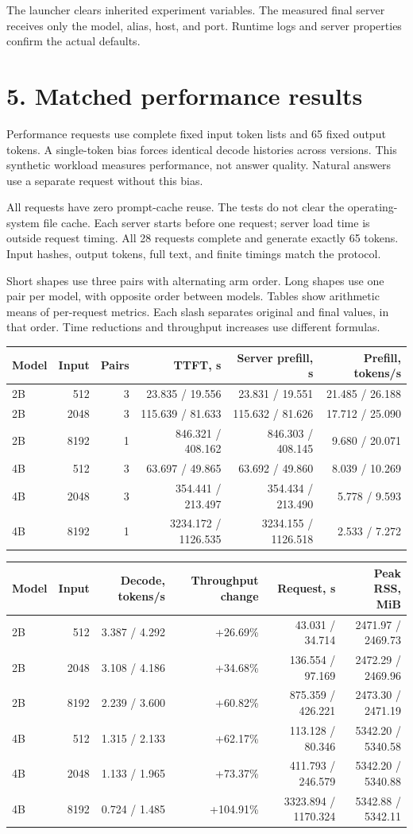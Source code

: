 \documentclass[10pt,a4paper]{article}
\begin{document}
The launcher clears inherited experiment variables. The measured final
server receives only the model, alias, host, and port. Runtime logs and
server properties confirm the actual defaults.

\hypertarget{matched-performance-results}{%
\section{5. Matched performance
results}\label{matched-performance-results}}

Performance requests use complete fixed input token lists and 65 fixed
output tokens. A single-token bias forces identical decode histories
across versions. This synthetic workload measures performance, not
answer quality. Natural answers use a separate request without this
bias.

All requests have zero prompt-cache reuse. The tests do not clear the
operating-system file cache. Each server starts before one request;
server load time is outside request timing. All 28 requests complete and
generate exactly 65 tokens. Input hashes, output tokens, full text, and
finite timings match the protocol.

Short shapes use three pairs with alternating arm order. Long shapes use
one pair per model, with opposite order between models. Tables show
arithmetic means of per-request metrics. Each slash separates original
and final values, in that order. Time reductions and throughput
increases use different formulas.

\begin{longtable}[]{@{}lrrrrr@{}}
\toprule
Model & Input & Pairs & TTFT, s & Server prefill, s & Prefill,
tokens/s\tabularnewline
\midrule
\endhead
2B & 512 & 3 & 23.835 / 19.556 & 23.831 / 19.551 & 21.485 /
26.188\tabularnewline
2B & 2048 & 3 & 115.639 / 81.633 & 115.632 / 81.626 & 17.712 /
25.090\tabularnewline
2B & 8192 & 1 & 846.321 / 408.162 & 846.303 / 408.145 & 9.680 /
20.071\tabularnewline
4B & 512 & 3 & 63.697 / 49.865 & 63.692 / 49.860 & 8.039 /
10.269\tabularnewline
4B & 2048 & 3 & 354.441 / 213.497 & 354.434 / 213.490 & 5.778 /
9.593\tabularnewline
4B & 8192 & 1 & 3234.172 / 1126.535 & 3234.155 / 1126.518 & 2.533 /
7.272\tabularnewline
\bottomrule
\end{longtable}

\begin{longtable}[]{@{}lrrrrr@{}}
\toprule
Model & Input & Decode, tokens/s & Throughput change & Request, s & Peak
RSS, MiB\tabularnewline
\midrule
\endhead
2B & 512 & 3.387 / 4.292 & +26.69\% & 43.031 / 34.714 & 2471.97 /
2469.73\tabularnewline
2B & 2048 & 3.108 / 4.186 & +34.68\% & 136.554 / 97.169 & 2472.29 /
2469.96\tabularnewline
2B & 8192 & 2.239 / 3.600 & +60.82\% & 875.359 / 426.221 & 2473.30 /
2471.19\tabularnewline
4B & 512 & 1.315 / 2.133 & +62.17\% & 113.128 / 80.346 & 5342.20 /
5340.58\tabularnewline
4B & 2048 & 1.133 / 1.965 & +73.37\% & 411.793 / 246.579 & 5342.20 /
5340.88\tabularnewline
4B & 8192 & 0.724 / 1.485 & +104.91\% & 3323.894 / 1170.324 & 5342.88 /
5342.11\tabularnewline
\bottomrule
\end{longtable}
\end{document}
